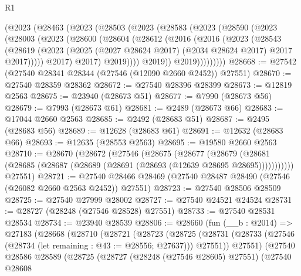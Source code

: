 \begin{lexlean}{R1}
\begin{coremodule}
      (@2023
        (@28463
          (@2023
            (@28503
              (@2023
                (@28583
                  (@2023
                    (@28590
                      (@2023
                        (@28003
                          (@2023
                            (@28600
                              (@28604
                                (@28612
                                  (@2016
                                    (@2016
                                      (@2023
                                        (@28543
                                          (@28619
                                            (@2023
                                              (@2025
                                                (@2027 @28624 @2017)
                                                (@2034 @28624 @2017)
                                                @2017
                                                @2017)))))
                                      @2017)
                                    @2017)
                                  @2019))))
                          @2019))
                      @2019)))))))))
@28668 := @27542 (@27540 @28341 @28344 (@27546 (@12090 @2660 @2452)) @27551)
@28670 := @27540 @28359 @28362
@28672 := @27540 @28396 @28399
@28673 := @12819 @2563
@28675 := @23940 (@28673 @51)
@28677 := @7990 (@28673 @56)
@28679 := @7993 (@28673 @61)
@28681 := @2489 (@28673 @66)
@28683 := @17044 @2660 @2563
@28685 := @2492 (@28683 @51)
@28687 := @2495 (@28683 @56)
@28689 := @12628 (@28683 @61)
@28691 := @12632 (@28683 @66)
@28693 := @12635 (@28553 @2563)
@28695 := @19580 @2660 @2563
@28710 := @28670
    (@28672
      (@27546
        (@28675
          (@28677
            (@28679 (@28681 (@28685 (@28687 (@28689 (@28691 (@28693 (@12639 @28695 @28695)))))))))))
      @27551)
@28721 := @27540 @28466 @28469 (@27540 @28487 @28490 (@27546 (@26082 @2660 @2563 @2452)) @27551)
@28723 := @27540 @28506 @28509
@28725 := @27540 @27999 @28002
@28727 := @27540 @24521 @24524
@28731 := @28727 (@28248 (@27546 @28528) @27551)
@28733 := @27540 @28531 @28534
@28734 := @23940 @28539
@28806 := @28660
    (fun (__b : @2014) =>
    @27183
      (@28668
        (@28710
          (@28721
            (@28723
              (@28725
                (@28731 (@28733 (@27546 (@28734 (let remaining : @43 := @28556; @27637))) @27551))
                @27551)
              (@27540
                @28586
                @28589
                (@28725
                  (@28727
                    (@28248 (@27546 @28605) @27551)
                    (@27540
                      @28608

\end{coremodule}
\end{lexlean}
